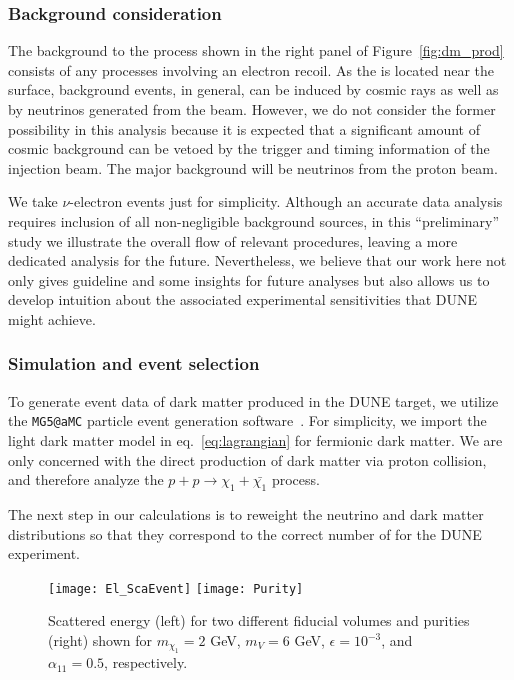 \subsubsection{Background consideration}
 The background to the process shown in the right panel of Figure~\ref{fig:dm_prod} consists of any processes involving an electron recoil. As the  is located near the surface, background events, in general, can be induced by cosmic rays as well as by neutrinos generated from the beam. However, we do not consider the former possibility in this analysis because it is expected that a significant amount of cosmic background can be vetoed by the trigger and timing information of the injection beam. 
The major background will be neutrinos %
from the proton beam. 

We take $\nu$-electron %
 events just for simplicity. 
Although an accurate data analysis requires  inclusion of all non-negligible background sources, in this ``preliminary'' study we %
illustrate the overall flow of relevant procedures, leaving a more dedicated analysis for the future.
Nevertheless, we believe that our work here  not only gives guideline and some insights for future %
analyses but also allows us to develop  intuition about the associated experimental sensitivities that DUNE %
might achieve.

\subsubsection{Simulation and event selection}
To generate event data of dark matter produced in the DUNE target, we
utilize the \texttt{MG5@aMC} particle event generation software~\cite{Alwall:2014hca}. 
For simplicity, we import 
the light dark matter model in eq.~\eqref{eq:lagrangian} for fermionic dark matter. We are only concerned with the direct production of dark matter via proton collision, and therefore analyze  the $p + p \rightarrow \chi_1 + \bar{\chi_1}$ process. 

    
    The next step in our calculations is to reweight the neutrino and dark
matter distributions so that they correspond to the correct number of  for the DUNE experiment. 

 \begin{figure}[!h]
 \centering
 \texttt{[image: El\_ScaEvent]}
 \texttt{[image: Purity]}
 \caption[Scattered energy for two fiducial volumes and purities]{\label{fig:scatter_E} Scattered energy (left) for two different fiducial volumes and purities (right) shown for $m_{\chi_1}=2$ GeV, $m_{V}=6$ GeV, $\epsilon=10^{-3}$, and $\alpha_{11}=0.5$, respectively. }
 \end{figure}
 
